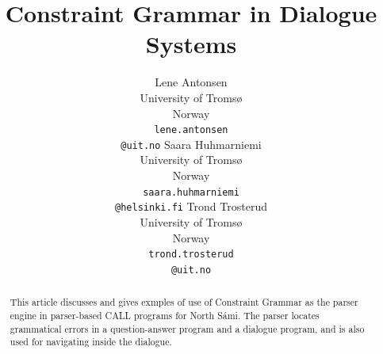 \documentclass[11pt]{article}
\begin{document}
\title{Constraint Grammar in Dialogue Systems}

\author{Lene Antonsen\\
  University of Tromsø\\
  Norway\\
  {\tt lene.antonsen}\\{\tt @uit.no}  \And
  Saara Huhmarniemi\\
  University of Tromsø\\
  Norway\\
  {\tt saara.huhmarniemi}\\{\tt @helsinki.fi}  \And
  Trond Trosterud\\
  University of Tromsø\\
  Norway\\
  {\tt trond.trosterud}\\{\tt @uit.no}}



\maketitle
{}


 
\maketitle

\begin{abstract}
This article discusses and gives exmples of use of Constraint Grammar as the parser engine in parser-based CALL programs for North Sámi. The parser locates grammatical errors in a question-answer program and a dialogue program, and is also used for navigating inside the dialogue.

\end{abstract}
\end{document}
